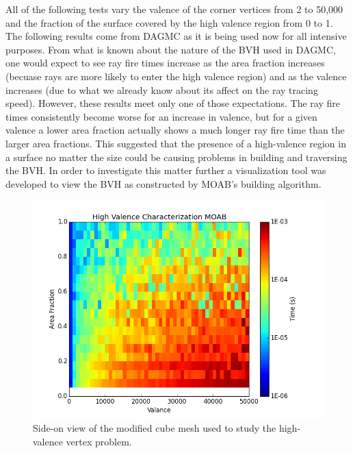 \documentclass[12pt, a4paper]{article}
\begin{document}
All of the following tests vary the valence of the corner vertices from 2 to 50,000 and the fraction of the surface covered by the high valence region from 0 to 1. The following results come from DAGMC as it is being used now for all intensive purposes. From what is known about the nature of the BVH used in DAGMC, one would expect to see ray fire times increase as the area fraction increases (becuase rays are more likely to enter the high valence region) and as the valence increases (due to what we already know about its affect on the ray tracing speed). However, these results meet only one of those expectations. The ray fire times consistently become worse for an increase in valence, but for a given valence a lower area fraction actually shows a much longer ray fire time than the larger area fractions. This suggested that the presence of a high-valence region in a surface no matter the size could be causing problems in building and traversing the BVH. In order to investigate this matter further a visualization tool was developed to view the BVH as constructed by MOAB's building algorithm.

\begin{figure}[H]
  \centering
    \includegraphics[scale=0.45]{hv_study_MOAB.png}
    \caption{Side-on view of the modified cube mesh used to study the high-valence vertex problem.}
    \label{hvsideon}
\end{figure}
\end{document}
